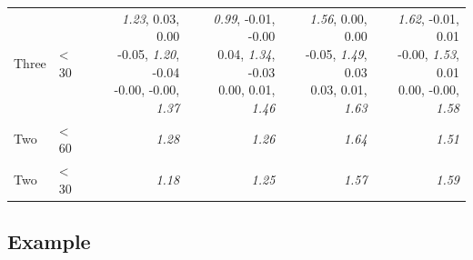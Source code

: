\documentclass[12pt,PhD,twoside,openright]{muthesis}
\begin{document}
\begin{table}[!h]
\begin{tabular}[t]{>{}l>{}l>{\ttfamily}r>{\ttfamily}r>{\ttfamily}r>{\ttfamily}r}
\hspace{1em}Three & < 30 & \makecell[r]{\emph{1.23},  0.03,  0.00\\ -0.05,  \emph{1.20}, -0.04\\ -0.00, -0.00,  \emph{1.37}} & \makecell[r]{\emph{0.99}, -0.01, -0.00\\  0.04,  \emph{1.34}, -0.03\\  0.00,  0.01,  \emph{1.46}} & \makecell[r]{\emph{1.56},  0.00,  0.00\\ -0.05,  \emph{1.49},  0.03\\  0.03,  0.01,  \emph{1.63}} & \makecell[r]{\emph{1.62}, -0.01,  0.01\\ -0.00,  \emph{1.53},  0.01\\  0.00, -0.00,  \emph{1.58}}\\
\rowcolor{gray!6}  \hspace{1em}Two & < 60 & \emph{1.28} & \emph{1.26} & \emph{1.64} & \emph{1.51}\\
\hspace{1em}Two & < 30 & \emph{1.18} & \emph{1.25} & \emph{1.57} & \emph{1.59}\\
\bottomrule
\end{tabular}
\end{table}
\hypertarget{example-1}{%
\subsection{Example}\label{example-1}}
\end{document}
